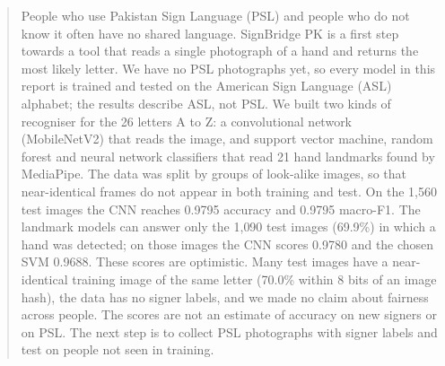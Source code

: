 \begin{abstract}
\noindent
People who use Pakistan Sign Language (PSL) and people who do not know it often have no shared language. SignBridge PK is a first step towards a tool that reads a single photograph of a hand and returns the most likely letter. We have no PSL photographs yet, so every model in this report is trained and tested on the American Sign Language (ASL) alphabet; the results describe ASL, not PSL. We built two kinds of recogniser for the 26 letters A to Z: a convolutional network (MobileNetV2) that reads the image, and support vector machine, random forest and neural network classifiers that read 21 hand landmarks found by MediaPipe. The data was split by groups of look-alike images, so that near-identical frames do not appear in both training and test. On the 1{,}560 test images the CNN reaches 0.9795 accuracy and 0.9795 macro-F1. The landmark models can answer only the 1{,}090 test images (69.9\%) in which a hand was detected; on those images the CNN scores 0.9780 and the chosen SVM 0.9688. These scores are optimistic. Many test images have a near-identical training image of the same letter (70.0\% within 8 bits of an image hash), the data has no signer labels, and we made no claim about fairness across people. The scores are not an estimate of accuracy on new signers or on PSL. The next step is to collect PSL photographs with signer labels and test on people not seen in training.
\end{abstract}
